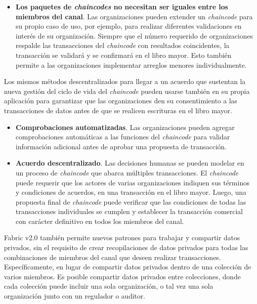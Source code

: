 {\begin{itemize}
\item {\bf Los paquetes de \emph{chaincodes} no necesitan ser iguales entre los miembros del canal}. Las organizaciones pueden extender un \emph{chaincode} para su propio caso de uso, por ejemplo, para realizar diferentes validaciones en inter\'es de su organizaci\'on. Siempre que el n\'umero requerido de organizaciones respalde las transacciones del \emph{chaincode} con resultados coincidentes, la transacci\'on se validar\'a y se confirmar\'a en el libro mayor. Esto tambi\'en permite a las organizaciones implementar arreglos menores individualmente.
\end{itemize}

Los mismos m\'etodos descentralizados para llegar a un acuerdo que sustentan la nueva gesti\'on del ciclo de vida del \emph{chaincode} pueden usarse tambi\'en en su propia aplicaci\'on para garantizar que las organizaciones den su consentimiento a las transacciones de datos antes de que se realicen escrituras en el libro mayor.\\

\begin{itemize}
\item {\bf Comprobaciones automatizadas}. Las organizaciones pueden agregar comprobaciones autom\'aticas a las funciones del \emph{chaincode} para validar informaci\'on adicional antes de aprobar una propuesta de transacci\'on.

\item {\bf Acuerdo descentralizado}. Las decisiones humanas se pueden modelar en un proceso de \emph{chaincode} que abarca m\'ultiples transacciones. El \emph{chaincode} puede requerir que los actores de varias organizaciones indiquen sus t\'erminos y condiciones de acuerdos, en una transacci\'on en el libro mayor. Luego, una propuesta final de \emph{chaincode} puede verificar que las condiciones de todas las transacciones individuales se cumplen y establecer la transacci\'on comercial con car\'acter definitivo en todos los miembros del canal.
\end{itemize}

Fabric v2.0 tambi\'en permite nuevos patrones para trabajar y compartir datos privados, sin el requisito de crear recopilaciones de datos privados para todas las combinaciones de miembros del canal que deseen realizar transacciones. Espec\'ificamente, en lugar de compartir datos privados dentro de una colecci\'on de varios miembros. Es posible compartir datos privados entre colecciones, donde cada colecci\'on puede incluir una sola organizaci\'on, o tal vez una sola organizaci\'on junto con un regulador o auditor.\\

}
